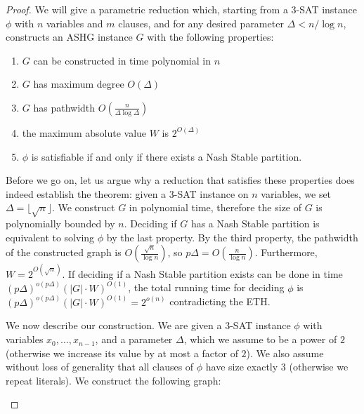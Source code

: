 \documentclass[letterpaper,USenglish,cleveref, autoref, thm-restate]{lipics-v2021}
\begin{document}
\begin{proof}

We will give a parametric reduction which, starting from a 3-\textsc{SAT}
instance $\phi$ with $n$ variables and $m$ clauses, and for any desired
parameter $\Delta<n/\log n$, constructs an ASHG instance $G$ with the following
properties: 


\begin{enumerate} 

\item $G$ can be constructed in time polynomial in $n$ 

\item $G$ has maximum degree $O(\Delta)$ 

\item $G$ has pathwidth $O(\frac{n}{\Delta\log\Delta})$ 

\item the maximum absolute value $W$ is $2^{O(\Delta)}$ 

\item  $\phi$ is satisfiable if and only if there exists a Nash Stable
partition.

\end{enumerate}

Before we go on, let us argue why a reduction that satisfies these properties
does indeed establish the theorem: given a 3-\textsc{SAT} instance on $n$
variables, we set $\Delta=\lfloor\sqrt{n}\rfloor$.  We construct $G$ in
polynomial time, therefore the size of $G$ is polynomially bounded by $n$.
Deciding if $G$ has a Nash Stable partition is equivalent to solving $\phi$ by
the last property. By the third property, the pathwidth of the constructed
graph is $O(\frac{\sqrt{n}}{\log n})$, so $p\Delta = O(\frac{n}{\log n})$.
Furthermore, $W=2^{O(\sqrt{n})}$. If deciding if a Nash Stable partition exists
can be done in time $(p\Delta)^{o(p\Delta)}(|G|\cdot W)^{O(1)}$, the total
running time for deciding $\phi$ is $(p\Delta)^{o(p\Delta)} (|G|\cdot W)^{O(1)}
= 2^{o(n)}$ contradicting the ETH.

We now describe our construction. We are given a 3-\textsc{SAT} instance $\phi$
with variables $x_0,\ldots,x_{n-1}$, and a parameter $\Delta$, which we assume
to be a power of $2$ (otherwise we increase its value by at most a factor of
$2$).  We also assume without loss of generality that all clauses of $\phi$
have size exactly $3$ (otherwise we repeat literals). We construct the
following graph:

\begin{enumerate}


\end{enumerate}
\end{proof}
\end{document}

